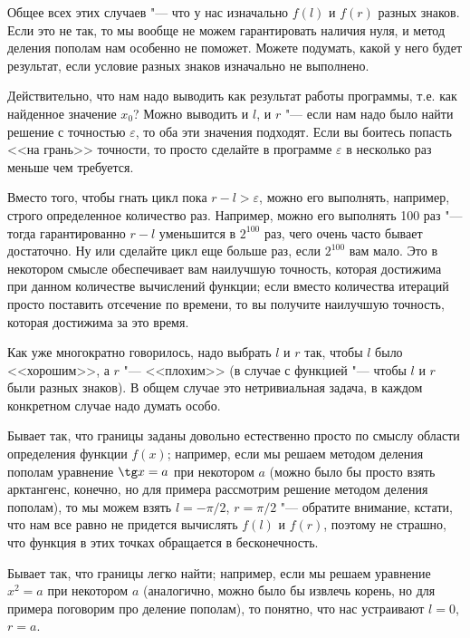 \documentclass[a4paper,10pt]{problems}
\let\eps\varepsilon
\begin{document}
Общее всех этих случаев "--- что у нас изначально $f(l)$ и $f(r)$ разных знаков. 
Если это не так, то мы вообще не можем гарантировать наличия нуля, и метод деления пополам нам особенно не поможет.
Можете подумать, какой у него будет результат, если условие разных знаков изначально не выполнено.

 Действительно, что нам надо выводить как результат работы программы, т.е. как найденное значение $x_0$?
Можно выводить и $l$, и $r$ "--- если нам надо было найти решение с точностью $\eps$, то оба эти значения подходят.
Если вы боитесь попасть <<на грань>> точности, то просто сделайте в программе $\eps$ в несколько раз меньше чем требуется.


\lheader{Решение без $\eps$} Вместо того, чтобы гнать цикл пока $r-l>\eps$, можно его выполнять, например, строго определенное количество раз.
Например, можно его выполнять 100 раз "--- тогда гарантированно $r-l$ уменьшится в $2^{100}$ раз, чего очень часто бывает достаточно.
Ну или сделайте цикл еще больше раз, если $2^{100}$ вам мало. 
Это в некотором смысле обеспечивает вам наилучшую точность, которая достижима при данном количестве вычислений функции;
если вместо количества итераций просто поставить отсечение по времени, то вы получите наилучшую точность, которая достижима за это время.

 Как уже многократно говорилось, надо выбрать $l$ и $r$ так, чтобы $l$ было <<хорошим>>, а $r$ "--- <<плохим>>
(в случае с функцией "--- чтобы $l$ и $r$ были разных знаков). 
В общем случае это нетривиальная задача, в каждом конкретном случае надо думать особо.

Бывает так, что границы заданы довольно естественно просто по смыслу области определения функции $f(x)$;
например, если мы решаем методом деления пополам уравнение $\tg x=a$ при некотором $a$ 
(можно было бы просто взять арктангенс, конечно, но для примера рассмотрим решение методом деления пополам), 
то мы можем взять $l=-\pi/2$, $r=\pi/2$ "--- обратите внимание, кстати, что нам все равно не придется вычислять $f(l)$ и $f(r)$, поэтому не страшно,
что функция в этих точках обращается в бесконечность.

Бывает так, что границы легко найти; например, если мы решаем уравнение $x^2=a$ при некотором $a$
(аналогично, можно было бы извлечь корень, но для примера поговорим про деление пополам), то понятно,
что нас устраивают $l=0$, $r=a$.
\end{document}
